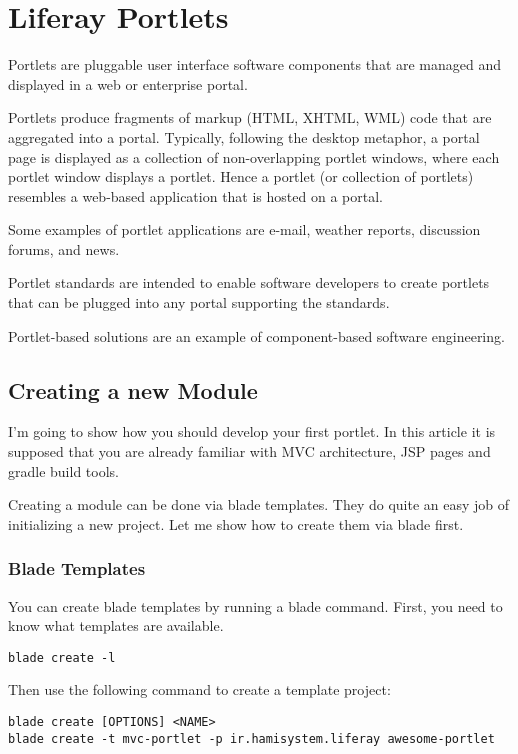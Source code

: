 \section{Liferay Portlets}

Portlets are pluggable user interface software components that are managed and displayed in a web or enterprise portal.

Portlets produce fragments of markup (HTML, XHTML, WML) code that are aggregated into a portal. Typically, following the desktop metaphor, a portal page is displayed as a collection of non-overlapping portlet windows, where each portlet window displays a portlet. Hence a portlet (or collection of portlets) resembles a web-based application that is hosted on a portal.

Some examples of portlet applications are e-mail, weather reports, discussion forums, and news.

Portlet standards are intended to enable software developers to create portlets that can be plugged into any portal supporting the standards.

Portlet-based solutions are an example of component-based software engineering.

\subsection{Creating a new Module}

I'm going to show how you should develop your first portlet. In this article it is supposed that you are already familiar with MVC architecture, JSP pages and gradle build tools.

Creating a module can be done via blade templates. They do quite an easy job of initializing a new project. Let me show how to create them via blade first.

\subsubsection{Blade Templates}

You can create blade templates by running a blade command. First, you need to know what templates are available.

\lstset{language=bash}
\begin{lstlisting}
blade create -l
\end{lstlisting}

Then use the following command to create a template project:

\lstset{language=bash}
\begin{lstlisting}
blade create [OPTIONS] <NAME>
blade create -t mvc-portlet -p ir.hamisystem.liferay awesome-portlet
\end{lstlisting}

